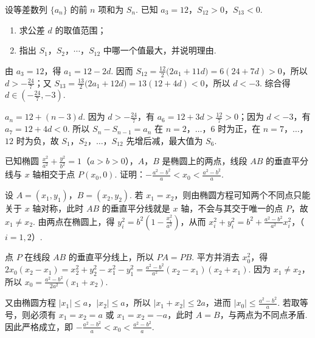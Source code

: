 \begin{problem}
设等差数列 \(\{a_n\}\) 的前 \(n\) 项和为 \(S_n\). 已知 \(a_3=12\)，\(S_{12}>0\)，\(S_{13}<0\).

\begin{enumerate}
\item 求公差 \(d\) 的取值范围；
\item 指出 \(S_1\)，\(S_2\)，\(\cdots\)，\(S_{12}\) 中哪一个值最大，并说明理由.
\end{enumerate}

\begin{solution}
由 \(a_3=12\)，得 \(a_1=12-2d\). 因而
\(S_{12}=\frac{12}{2}\bigl(2a_1+11d\bigr)=6(24+7d)>0\)，所以 \(d>-\frac{24}{7}\)；又
\(S_{13}=\frac{13}{2}\bigl(2a_1+12d\bigr)=13(12+4d)<0\)，所以 \(d<-3\). 综合得 \(d\in\left(-\frac{24}{7},-3\right)\).

\(a_n=12+(n-3)d\). 因为 \(d>-\frac{24}{7}\)，有 \(a_6=12+3d>\frac{12}{7}>0\)；因为 \(d<-3\)，有 \(a_7=12+4d<0\). 所以 \(S_n-S_{n-1}=a_n\) 在 \(n=2\)，\(\ldots\)，\(6\) 时为正，在 \(n=7\)，\(\ldots\)，\(12\) 时为负，故 \(S_1\)，\(S_2\)，\(\ldots\)，\(S_{12}\) 先增后减，最大值为 \(S_6\).
\end{solution}
\end{problem}

\begin{problem}
已知椭圆 \(\frac{x^2}{a^2}+\frac{y^2}{b^2}=1\)（\(a>b>0\)），\(A\)，\(B\) 是椭圆上的两点，线段 \(AB\) 的垂直平分线与 \(x\) 轴相交于点 \(P(x_0,0)\). 证明：\(-\frac{a^2-b^2}{a}<x_0<\frac{a^2-b^2}{a}\).

\begin{solution}
设 \(A=(x_1,y_1)\)，\(B=(x_2,y_2)\). 若 \(x_1=x_2\)，则由椭圆方程可知两个不同点只能关于 \(x\) 轴对称，此时 \(AB\) 的垂直平分线就是 \(x\) 轴，不会与其交于唯一的点 \(P\)，故 \(x_1\neq x_2\). 由两点在椭圆上，得
\(y_i^2=b^2\left(1-\frac{x_i^2}{a^2}\right)\)，从而
\(x_i^2+y_i^2=b^2+\frac{a^2-b^2}{a^2}x_i^2\)，（\(i=1,2\)）.

点 \(P\) 在线段 \(AB\) 的垂直平分线上，所以 \(PA=PB\). 平方并消去 \(x_0^2\)，得
\(2x_0(x_2-x_1)=x_2^2+y_2^2-x_1^2-y_1^2=\frac{a^2-b^2}{a^2}(x_2-x_1)(x_2+x_1)\). 因为 \(x_1\neq x_2\)，所以
\(x_0=\frac{a^2-b^2}{2a^2}(x_1+x_2)\).

又由椭圆方程 \(|x_1|\leqslant a\)，\(|x_2|\leqslant a\)，所以 \(|x_1+x_2|\leqslant2a\)，进而 \(|x_0|\leqslant\frac{a^2-b^2}{a}\). 若取等号，则必须有 \(x_1=x_2=a\) 或 \(x_1=x_2=-a\)，此时 \(A=B\)，与两点为不同点矛盾. 因此严格成立，即
\( -\frac{a^2-b^2}{a}<x_0<\frac{a^2-b^2}{a}\).
\end{solution}
\end{problem}
